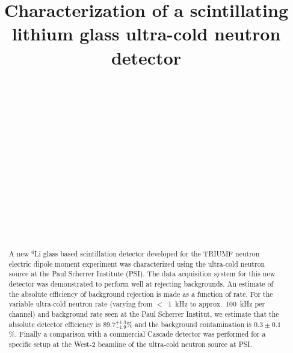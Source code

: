 \documentclass[twocolumn]{bmcart}
\begin{document}
\begin{frontmatter}
\begin{fmbox}
\title{Characterization of a scintillating lithium glass ultra-cold neutron detector }



\author[
  addressref={aWpg},
  corref={aWpg},
  email={bl.jamieson@uwinnipeg.ca}
]{~}
\author[
  addressref={aWpg}
]{~}
\author[
  addressref={aWpg}
]{~}
\author[
  addressref={aPSI}
]{~}
\author[
  addressref={aTRIUMF,aWpg}
]{~}
\author[
  addressref={aWpg}
]{~}
\author[
  addressref={aWpg}
]{~}
\author[
  addressref={aRCNP,aTRIUMF}
]{~}



\address[id=aWpg]{
  , 
  , 
  ,
}

\address[id=aPSI]{
  , 
  ,
  , 
}

\address[id=aTRIUMF]{
  , 
  , 
  , 
} 

\address[id=aRCNP]{
  ,
  ,
}

\end{fmbox}

\begin{abstractbox}

\begin{abstract}

A new $^{6}$Li glass based scintillation detector developed for the
TRIUMF neutron electric dipole moment experiment was characterized
using the ultra-cold neutron source at the Paul Scherrer Institute
(PSI).  The data acquisition system for this new detector was
demonstrated to perform well at rejecting backgrounds. An estimate of
the absolute efficiency of background rejection is made as a function
of rate.  For the variable ultra-cold neutron rate (varying from
$<$~1~kHz to approx.\ 100~kHz per channel) and background rate seen at
the Paul Scherrer Institut, we estimate that the absolute detector
efficiency is $89.7^{+1.3}_{-1.9}$\% and the background contamination
is $0.3\pm0.1$\%.  Finally a comparison with a commercial Cascade
detector was performed for a specific setup at the West-2 beamline of
the ultra-cold neutron source at PSI.


\end{abstract}
\end{abstractbox}
\end{frontmatter}
\end{document}

